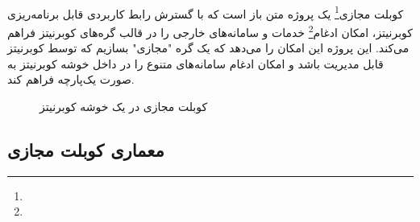 \paragraph{}
{
    کوبلت مجازی\footnote{} یک پروژه متن باز است که با گسترش رابط‌ کاربردی قابل برنامه‌ریزی کوبرنیتز، امکان ادغام\footnote{} خدمات و سامانه‌های خارجی را در قالب گره‌های کوبرنیتز فراهم می‌کند. این پروژه این امکان را می‌دهد که یک گره "مجازی" بسازیم که توسط کوبرنیتز قابل مدیریت باشد و امکان ادغام سامانه‌های متنوع را در داخل خوشه کوبرنیتز به صورت یک‌پارچه فراهم کند.    
    \begin{figure}[H]
     \caption{کوبلت مجازی در یک خوشه کوبرنیتز}
     \label{fig:virtkublet_arch}
    \end{figure}
}

\subsection{معماری کوبلت مجازی}
\label{subsec:vkube_arch}
